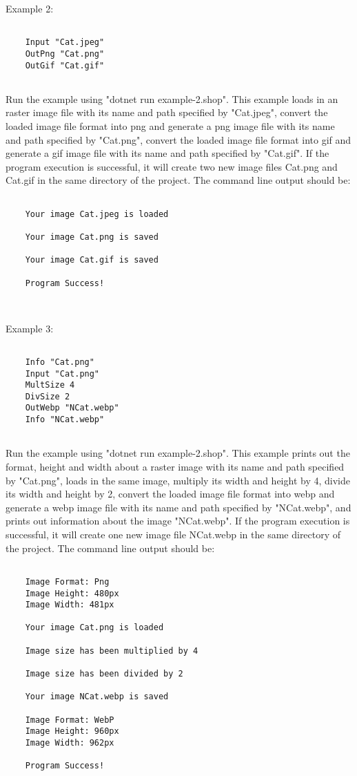 \documentclass{article}
\begin{document}
    Example 2:  \begin{verbatim}

    Input "Cat.jpeg"
    OutPng "Cat.png"
    OutGif "Cat.gif"
        
    \end{verbatim}

Run the example using "dotnet run example-2.shop". This example loads in an raster image file with its name and path specified by "Cat.jpeg", convert the loaded image file format into png and generate a png image file with its name and path specified by "Cat.png", convert the loaded image file format into gif and generate a gif image file with its name and path specified by "Cat.gif". If the program execution is successful, it will create two new image files Cat.png and Cat.gif in the same directory of the project. The command line output should be: 
    \begin{verbatim}

    Your image Cat.jpeg is loaded 

    Your image Cat.png is saved 

    Your image Cat.gif is saved 

    Program Success!

        
    \end{verbatim}
    

Example 3:  \begin{verbatim}

    Info "Cat.png"
    Input "Cat.png"
    MultSize 4
    DivSize 2
    OutWebp "NCat.webp"
    Info "NCat.webp"
        
    \end{verbatim}

Run the example using "dotnet run example-2.shop". This example prints out the format, height and width about a raster image with its name and path specified by "Cat.png", loads in the same image, multiply its width and height by 4, divide its width and height by 2, convert the loaded image file format into webp and generate a webp image file with its name and path specified by "NCat.webp", and prints out information about the image "NCat.webp". If the program execution is successful, it will create one new image file NCat.webp in the same directory of the project. The command line output should be: 
    \begin{verbatim}

    Image Format: Png
    Image Height: 480px
    Image Width: 481px 

    Your image Cat.png is loaded 

    Image size has been multiplied by 4 

    Image size has been divided by 2 

    Your image NCat.webp is saved 

    Image Format: WebP
    Image Height: 960px
    Image Width: 962px 

    Program Success!
        
    \end{verbatim}
    
\end{document}
